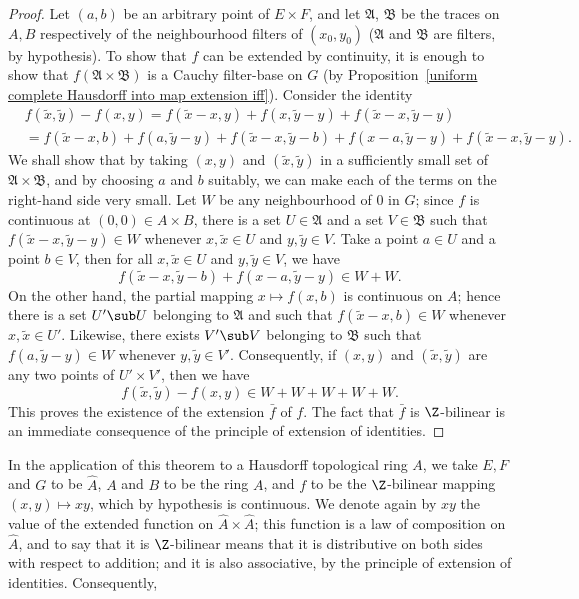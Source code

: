 \begin{proof}
Let $(a,b)$ be an arbitrary point of $E\times F$, and let $\mathfrak{A}$, $\mathfrak{B}$ be the traces on $A,B$ respectively of the neighbourhood filters of $(x_0,y_0)$ ($\mathfrak{A}$ and $\mathfrak{B}$ are filters, by hypothesis). To show that $f$ can be extended by continuity, it is enough to show that $f(\mathfrak{A}\times\mathfrak{B})$ is a Cauchy filter-base on $G$ (by Proposition~\ref{uniform complete Hausdorff into map extension iff}). Consider the identity
\begin{align*}
&f(\tilde{x},\tilde{y})-f(x,y)=f(\tilde{x}-x,y)+f(x,\tilde{y}-y)+f(\tilde{x}-x,\tilde{y}-y)\\
&=f(\tilde{x}-x,b)+f(a,\tilde{y}-y)+f(\tilde{x}-x,\tilde{y}-b)+f(x-a,\tilde{y}-y)+f(\tilde{x}-x,\tilde{y}-y).
\end{align*}
We shall show that by taking $(x,y)$ and $(\tilde{x},\tilde{y})$ in a sufficiently small set of $\mathfrak{A}\times\mathfrak{B}$, and by choosing $a$ and $b$ suitably, we can make each of the terms on the right-hand side very small. Let $W$ be any neighbourhood of $0$ in $G$; since $f$ is continuous at $(0,0)\in A\times B$, there is a set $U\in\mathfrak{A}$ and a set $V\in\mathfrak{B}$ such that $f(\tilde{x}-x,\tilde{y}-y)\in W$ whenever $x,\tilde{x}\in U$ and $y,\tilde{y}\in V$. Take a point $a\in U$ and a point $b\in V$, then for all $x,\tilde{x}\in U$ and $y,\tilde{y}\in V$, we have
\[f(\tilde{x}-x,\tilde{y}-b)+f(x-a,\tilde{y}-y)\in W+W.\]
On the other hand, the partial mapping $x\mapsto f(x,b)$ is continuous on $A$; hence there is a set $U'\sub U$ belonging to $\mathfrak{A}$ and such that $f(\tilde{x}-x,b)\in W$ whenever $x,\tilde{x}\in U'$. Likewise, there exists $V'\sub V$ belonging to $\mathfrak{B}$ such that $f(a,\tilde{y}-y)\in W$ whenever $y,\tilde{y}\in V'$. Consequently, if $(x,y)$ and $(\tilde{x},\tilde{y})$ are any two points of $U'\times V'$, then we have
\[f(\tilde{x},\tilde{y})-f(x,y)\in W+W+W+W+W.\]
This proves the existence of the extension $\bar{f}$ of $f$. The fact that $\bar{f}$ is $\Z$-bilinear is an immediate consequence of the principle of extension of identities. 
\end{proof}
In the application of this theorem to a Hausdorff topological ring $A$, we take $E,F$ and $G$ to be $\widehat{A}$, $A$ and $B$ to be the ring $A$, and $f$ to be the $\Z$-bilinear mapping $(x,y)\mapsto xy$, which by hypothesis is continuous. We denote again by $xy$ the value of the extended function on $\widehat{A}\times\widehat{A}$; this function is a law of composition on $\widehat{A}$, and to say that it is $\Z$-bilinear means that it is distributive on both sides with respect to addition; and it is also associative, by the principle of extension of identities. Consequently,
